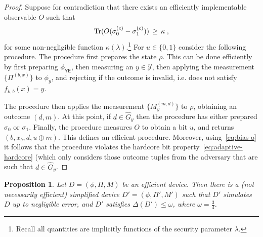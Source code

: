 \documentclass[11pt]{article}
\newtheorem{proposition}[theorem]{Proposition}
\theoremstyle{remark}
\theoremstyle{definition}
\newcommand{\Tr}{\mbox{\rm Tr}}
\newcommand{\reg}[1]{{\textsf{#1}}}
\newcommand{\mY}{\ensuremath{\mathcal{Y}}}
\newcommand{\dset}{G}
\begin{document}
\begin{proof}
Suppose for contradiction that there exists an efficiently implementable observable $O$ such that 
\begin{equation}\label{eq:bias-o}
\Tr(O(\sigma_0^{(c)}-\sigma_1^{(c)})) \,\geq\, \kappa\;,
\end{equation}
 for some non-negligible function $\kappa(\lambda)$.\footnote{Recall all quantities are implicitly functions of the security parameter $\lambda$.} For $u\in\{0,1\}$ consider the following procedure. The procedure first prepares the state $\rho$. This can be done efficiently by first preparing $\phi_{\reg{YE}}$, then measuring an $y\in \mY$, then applying the measurement $\{\Pi^{(b,x)}\}$ to $\phi_y$, and rejecting if the outcome is invalid, i.e. does not satisfy $f_{k,b}(x)=y$. 

The procedure then applies the measurement $\{M_y^{(m,d)}\}$ to $\rho$, obtaining an outcome $(d,m)$. At this point, if $d\in \hat{\dset}_{y}$ then the procedure has either prepared $\sigma_0$ or $\sigma_1$. Finally, the procedure  measures $O$ to obtain a bit $u$, and returns $(b,x_b,d,u\oplus m)$. This defines an efficient procedure. Moreover, using~\eqref{eq:bias-o} it follows  that the procedure violates the hardcore bit property~\eqref{eq:adaptive-hardcore} (which only considers those outcome tuples from the adversary that are such that $d\in\hat{\dset}_{y}$. 
\end{proof}


\begin{proposition}\label{prop:change-d}
Let $D=(\phi,\Pi,M)$ be an efficient device. Then there is a (not necessarily efficient) simplified device $D'=(\phi,\Pi',M')$ such that $D'$ simulates $D$ up to negligible error, and $D'$ satisfies $\Delta(D') \leq \omega$, where $\omega = \frac{3}{4}$.
\end{proposition}
\end{document}
